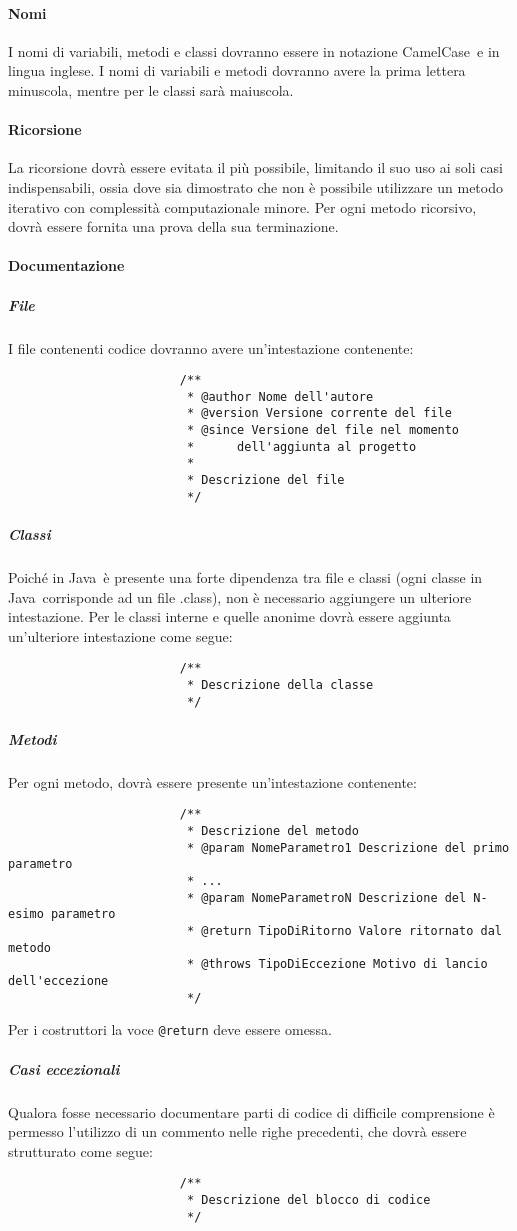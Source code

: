 \documentclass[../NormeProgetto.text]{subfiles}
\begin{document}
			\paragraph{Nomi}
				I nomi di variabili, metodi e classi dovranno essere in notazione CamelCase\g\ e in lingua inglese. I nomi di variabili e metodi dovranno avere la prima lettera minuscola, mentre per le classi sarà maiuscola.
			\paragraph{Ricorsione}
				La ricorsione dovrà essere evitata il più possibile, limitando il suo uso ai soli casi indispensabili, ossia dove sia dimostrato che non è possibile utilizzare un metodo iterativo con complessità computazionale minore. Per ogni metodo ricorsivo, dovrà essere fornita una prova della sua terminazione.
			\paragraph{Documentazione}
				\subparagraph{File}
					I file contenenti codice dovranno avere un'intestazione contenente:
					\begin{lstlisting}
						/**
						 * @author Nome dell'autore
						 * @version Versione corrente del file 
						 * @since Versione del file nel momento
						 *		dell'aggiunta al progetto
						 *
						 * Descrizione del file
						 */
					\end{lstlisting}
				\subparagraph{Classi}
					Poiché in Java\g\ è presente una forte dipendenza tra file e classi (ogni classe in Java\g\ corrisponde ad un file .class), non è necessario aggiungere un ulteriore intestazione. Per le classi interne e quelle anonime dovrà essere aggiunta un'ulteriore intestazione come segue:
					\begin{lstlisting}
						/**
						 * Descrizione della classe
						 */
					\end{lstlisting}
				\subparagraph{Metodi}
					Per ogni metodo, dovrà essere presente un'intestazione contenente:
					\begin{lstlisting}
						/**
						 * Descrizione del metodo
						 * @param NomeParametro1 Descrizione del primo parametro
						 * ...
						 * @param NomeParametroN Descrizione del N-esimo parametro
						 * @return TipoDiRitorno Valore ritornato dal metodo
						 * @throws TipoDiEccezione Motivo di lancio dell'eccezione
						 */
					\end{lstlisting}
					
					Per i costruttori la voce \texttt{@return} deve essere omessa.
				\subparagraph{Casi eccezionali}
					Qualora fosse necessario documentare parti di codice di difficile comprensione è permesso l'utilizzo di un commento nelle righe precedenti, che dovrà essere strutturato come segue:
					\begin{lstlisting}
						/**
						 * Descrizione del blocco di codice
						 */
					\end{lstlisting}
\end{document}
